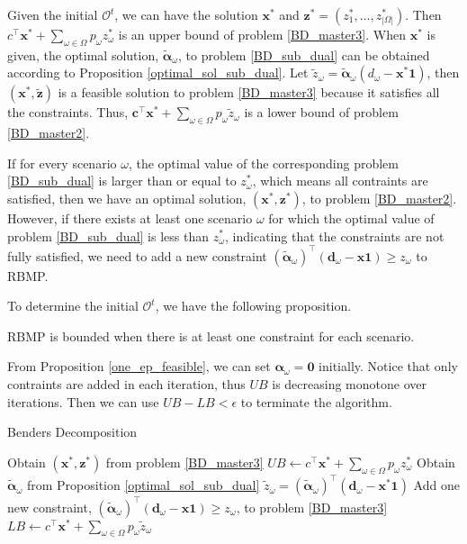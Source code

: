 Given the initial $\mathcal{O}^{t}$, we can have the solution $\mathbf{x}^{*}$ and $\mathbf{z}^{*} =(z^{*}_1,\ldots, z^{*}_{|\Omega|})$. Then $c^{\intercal} \mathbf{x}^{*} + \sum_{\omega \in \Omega} p_{\omega} z_{\omega}^{*}$ is an upper bound of problem \eqref{BD_master3}. When $\mathbf{x}^{*}$ is given, the optimal solution, $\bm{\tilde{\alpha}}_{\omega}$, to problem \eqref{BD_sub_dual} can be obtained according to Proposition \ref{optimal_sol_sub_dual}. Let $\tilde{z}_{\omega} = \bm{\tilde{\alpha}}_{\omega}(d_{\omega} - \mathbf{x}^{*} \mathbf{1})$, then $(\mathbf{x}^{*}, \mathbf{\tilde{z}})$ is a feasible solution to problem \eqref{BD_master3} because it satisfies all the constraints. Thus, $\mathbf{c}^{\intercal} \mathbf{x}^{*} + \sum_{\omega \in \Omega} p_{\omega} \tilde{z}_{\omega}$ is a lower bound of problem \eqref{BD_master2}.

If for every scenario $\omega$, the optimal value of the corresponding problem \eqref{BD_sub_dual} is larger than or equal to $z_{\omega}^{*}$, which means all contraints are satisfied, then we have an optimal solution, $(\mathbf{x}^{*}, \mathbf{z}^{*})$, to problem \eqref{BD_master2}. However, if there exists at least one scenario $\omega$ for which the optimal value of problem \eqref{BD_sub_dual} is less than $z_{\omega}^{*}$, indicating that the constraints are not fully satisfied, we need to add a new constraint $(\bm{\tilde{\alpha}}_{\omega})^{\intercal}(\mathbf{d}_{\omega} - \mathbf{x} \mathbf{1}) \geq z_{\omega}$ to RBMP.


To determine the initial $\mathcal{O}^{t}$, we have the following proposition.

\begin{prop}\label{one_ep_feasible}
RBMP is bounded when there is at least one constraint for each scenario.
\end{prop}

From Proposition \ref{one_ep_feasible}, we can set $\bm{\alpha}_{\omega} = \mathbf{0}$ initially. Notice that only contraints are added in each iteration, thus $UB$ is decreasing monotone over iterations. Then we can use $UB - LB < \epsilon$ to terminate the algorithm.

\begin{algorithm}[h]
  \caption{Benders Decomposition}\label{cut_algo}
    {Obtain $(\mathbf{x}^{*}, \mathbf{z}^{*})$ from problem \eqref{BD_master3}\;
    $UB \gets c^{\intercal} \mathbf{x}^{*} + \sum_{\omega \in \Omega} p_{\omega} z_{\omega}^{*}$\;
    {Obtain $\bm{\tilde{\alpha}}_{\omega}$ from Proposition \ref{optimal_sol_sub_dual}\; $\tilde{z}_{\omega}= (\bm{\tilde{\alpha}}_{\omega})^{\intercal}(\mathbf{d}_{\omega}- \mathbf{x}^{*} \mathbf{1})$\;
    {Add one new constraint, $(\bm{\tilde{\alpha}}_{\omega})^{\intercal}(\mathbf{d}_{\omega}- \mathbf{x} \mathbf{1}) \geq z_{\omega}$, to problem \eqref{BD_master3}\;}
    }
    {$LB \gets c^{\intercal} \mathbf{x}^{*} + \sum_{\omega \in \Omega} p_{\omega} \tilde{z}_{\omega} $\;}
    }
\end{algorithm}

